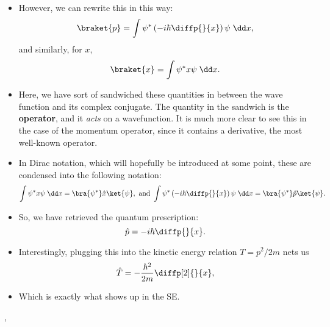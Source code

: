 \begin{itemize}
    \item However, we can rewrite this in this way:
        \begin{equation*}
            \braket{p} = \int \psi^* \left(-i\hbar \diffp{}{x}\right) \psi \;\dd x,
        \end{equation*}
        and similarly, for $x$,
        \begin{equation*}
            \braket{x} = \int \psi^* x \psi \;\dd x.
        \end{equation*}
    \item Here, we have sort of sandwiched these quantities in between the wave function and its complex conjugate. The quantity in the sandwich is the \textbf{operator}, and it \textit{acts} on a wavefunction. It is much more clear to see this in the case of the momentum operator, since it contains a derivative, the most well-known operator.
    \item In Dirac notation, which will hopefully be introduced at some point, these are condensed into the following notation:
        \begin{equation*}
            \int \psi^* x \psi \;\dd x = \bra{\psi^*} \hat{x} \ket{\psi},\ \text{and}\ \int \psi^* \left(-i\hbar\diffp{}{x}\right)\psi \;\dd x = \bra{\psi^*} \hat{p} \ket{\psi}.
        \end{equation*}
    \item So, we have retrieved the quantum prescription:
        \begin{equation*}
            \hat{p} = -i\hbar\diffp{}{x}.
        \end{equation*}
    \item Interestingly, plugging this into the kinetic energy relation $T = p^2/2m$ nets us
        \begin{equation}
            \hat{T} = -\frac{\hbar^2}{2m} \diffp[2]{}{x},
        \end{equation}
    \item Which is exactly what shows up in the SE.
\end{itemize}


\sep

